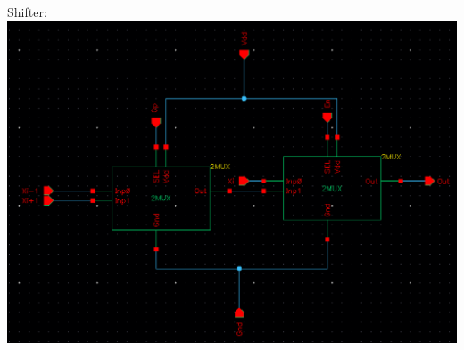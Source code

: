 \documentclass[12pt]{article}
\begin{document}
  Shifter:\\
  \includegraphics[scale=0.4]{shift.png}
  \\
\end{document}
